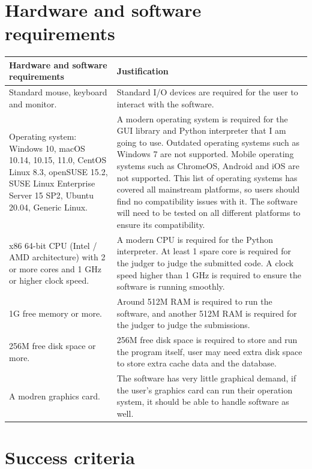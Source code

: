 \documentclass[a4paper]{report}
\begin{document}
\section{Hardware and software requirements}

\begin{tabulary}{\linewidth}{|L|L|}
    \hline
    Hardware and software requirements & Justification \\
    \hline
    Standard mouse, keyboard and monitor. & Standard I/O devices are required for the user to interact with the software. \\
    \hline
    Operating system: Windows 10, macOS 10.14, 10.15, 11.0, CentOS Linux 8.3, openSUSE 15.2, SUSE Linux Enterprise Server 15 SP2, Ubuntu 20.04, Generic Linux. & A modern operating system is required for the GUI library and Python interpreter that I am going to use. Outdated operating systems such as Windows 7 are not supported. Mobile operating systems such as ChromeOS, Android and iOS are not supported. This list of operating systems has covered all mainstream platforms, so users should find no compatibility issues with it. The software will need to be tested on all different platforms to ensure its compatibility. \\
    \hline
    x86 64-bit CPU (Intel / AMD architecture) with 2 or more cores and 1 GHz or higher clock speed. & A modern CPU is required for the Python interpreter. At least 1 spare core is required for the judger to judge the submitted code. A clock speed higher than 1 GHz is required to ensure the software is running smoothly. \\
    \hline
    1G free memory or more. & Around 512M RAM is required to run the software, and another 512M RAM is required for the judger to judge the submissions. \\
    \hline
    256M free disk space or more. & 256M free disk space is required to store and run the program itself, user may need extra disk space to store extra cache data and the database. \\
    \hline
    A modren graphics card. & The software has very little graphical demand, if the user's graphics card can run their operation system, it should be able to handle software as well. \\
    \hline
\end{tabulary}

\section{Success criteria}
\end{document}
